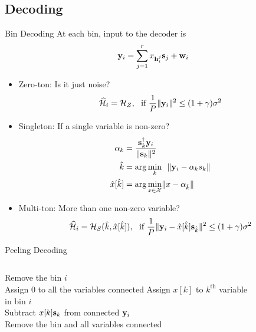 \documentclass[10pt]{beamer}
\begin{document}
\subsection{Decoding}
\begin{frame}{Bin Decoding}
At each bin, input to the decoder is 
\begin{equation*}
 \mathbf{y}_i=\sum_{j=1}^{r}x_{\mathbf{h}_{i}^{j}}\mathbf{s}_j+\mathbf{w}_i
\end{equation*}
\begin{itemize}
\item Zero-ton: Is it just noise?
\begin{equation*}
\widehat{\mathcal{H}}_i=\mathcal{H}_{Z}, ~~\text{if } \frac{1}{P}\lVert{\mathbf{y}_i}\rVert^2\leq (1+\gamma)\sigma^2
\end{equation*}
\item Singleton: If a single variable is non-zero?
\begin{align*}
\alpha_{k}&=\frac{\mathbf{s}_k^{\dagger}\mathbf{y}_i}{\lVert{\mathbf{s}_k}\rVert^2}\\
\hat{k}&=\arg \min_{k}~~ \lVert{\mathbf{y}_i-\alpha_{k}s_k}\rVert\\
\hat{x}[\hat{k}]&=\arg \min_{x\in\mathcal{X}} \lVert{x-\alpha_{\hat{k}}}\rVert
\end{align*}
\item Multi-ton: More than one non-zero variable?
\begin{equation*}
\widehat{\mathcal{H}}_i=\mathcal{H}_{S}(\hat{k},\hat{x}[\hat{k}]), ~~\text{if } \frac{1}{P}\lVert{\mathbf{y}_{i}-\hat{x}[\hat{k}]\mathbf{s}_{\hat{k}}}\rVert^2\leq (1+\gamma)\sigma^2
\end{equation*}
\end{itemize}
\end{frame}

\begin{frame}{Peeling Decoding}
\begin{columns}
\begin{column}{0.55\textwidth}
\begin{algorithmic}
    \State Remove the bin $i$\\
   \hspace{2ex} Assign $0$ to all the variables connected
   \hspace{4ex} Assign $x[k]$ to $k^{\text{th}}$ variable in bin $i$\\
  \hspace{2ex} Subtract $x[k]\mathbf{s}_k$ from connected $\mathbf{y}_i$  \\
  \hspace{2ex} Remove the bin and all variables connected
\EndIf
\EndWhile
\end{algorithmic}
\end{column}

\begin{column}{0.45\textwidth}
\begin{figure}
\scalebox{5}{}
\end{figure}
\end{column}

\end{columns}
\end{frame}
\end{document}
